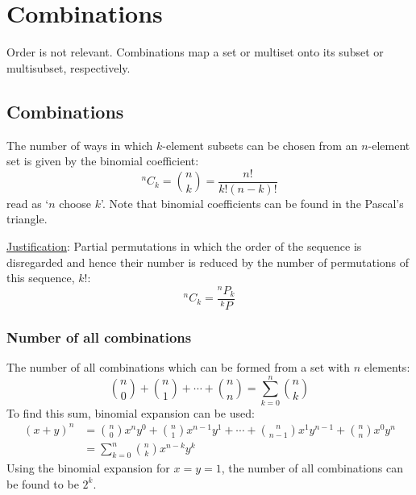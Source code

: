 \documentclass{article}
\begin{document}

\section{Combinations}

Order is not relevant.
Combinations map a set or multiset onto its subset or multisubset, respectively.

\subsection{Combinations}
\label{combinations}

The number of ways in which $k$\nobreakdash-\hspace{0pt}element subsets can be chosen from an $n$\nobreakdash-\hspace{0pt}element set is given by the binomial coefficient:
%
\begin{equation}
    ^nC_k = \binom{n}{k} = \frac{n!}{k!(n-k)!}
\end{equation}
%
read as `$n$ choose $k$'. Note that binomial coefficients can be found in the Pascal's triangle.

\underline{Justification}:
Partial permutations in which the order of the sequence is disregarded and hence their number is reduced by the number of permutations of this sequence, $k!$:
%
\begin{equation}
        ^nC_k = \frac{^nP_k}{^kP}
\end{equation}

\subsubsection{Number of all combinations}

The number of all combinations which can be formed from a set with $n$ elements:
%
\begin{equation}
    \label{eq:all_comb}
    \binom{n}{0} + \binom{n}{1} + \dotsb + \binom{n}{n}= \sum_{k=0}^{n} \binom{n}{k}
\end{equation}
%
To find this sum, binomial expansion can be used:
%
\begin{equation}
    \begin{split}
        (x+y)^n & = \binom{n}{0} x^n y^0 + \binom{n}{1} x^{n-1} y^1 + \dotsb + \binom{n}{n-1} x^1 y^{n-1} + \binom{n}{n} x^0 y^n \\
                & = \sum_{k=0}^{n} \binom{n}{k} x^{n-k} y^k
    \end{split}
\end{equation}
%
Using the binomial expansion for $x=y=1$, the number of all combinations can be found to be $2^k$.
\end{document}
